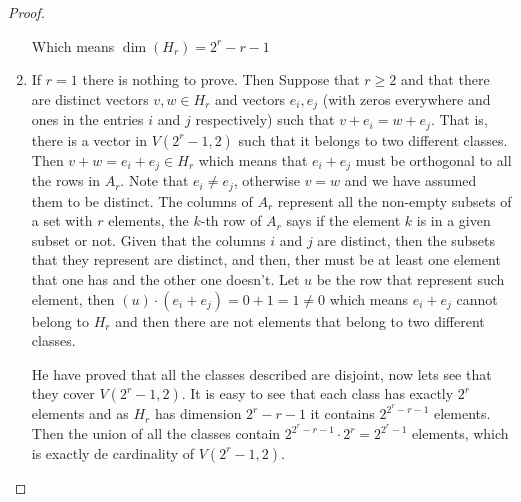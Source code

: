 \begin{proof}
\begin{enumerate}[label=(\roman*)]
            Which means $\dim(H_r) = 2^r - r - 1$
        \item
            If $r=1$ there is nothing to prove. Then Suppose that $r \geq 2$ and that there are distinct vectors $v, w \in H_r$ and vectors 
            $e_i, e_j$ (with zeros everywhere and ones in the entries $i$ and $j$ respectively) such that $v + e_i = w + e_j$. That is, there 
            is a vector in $V(2^r - 1, 2)$ such that it belongs to two different classes. Then $v + w = e_i + e_j \in H_r$ which means that 
            $e_i + e_j$ must be orthogonal to all the rows in $A_r$. Note that $e_i \neq e_j$, otherwise $v = w$ and we have assumed them to be
            distinct. The columns of $A_r$ represent all the non-empty subsets of a set with $r$ elements,
            the $k$-th row of $A_r$ says if the element $k$ is in a given subset or not. Given that the columns $i$ and $j$ are distinct, then
            the subsets that they represent are distinct, and then, ther must be at least one element that one has and the other one doesn't.
            Let $u$ be the row that represent such element, then $(u) \cdot (e_i + e_j) = 0 + 1 = 1 \neq 0$ which means  $e_i + e_j$ cannot belong
            to $H_r$ and then there are not elements that belong to two different classes.\pn
            
            He have proved that all the classes described are disjoint, now lets see that they cover $V(2^r - 1, 2)$. It is easy to see that 
            each class has exactly $2^r$ elements and as $H_r$ has dimension $2^r - r - 1$ it contains $2^{2^r - r - 1}$ elements. Then
            the union of all the classes contain $2^{2^r - r - 1} \cdot 2^r = 2^{2^r - 1}$ elements, which is exactly de cardinality of 
            $V(2^r - 1, 2)$.
    \end{enumerate}
\end{proof}